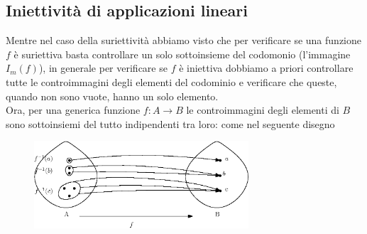 \subsection{Iniettività di applicazioni lineari}
Mentre nel caso della suriettività abbiamo visto che per verificare se una funzione $f$ è suriettiva basta
controllare un solo sottoinsieme del codomonio (l'immagine $I_m(f)$), in generale per verificare se $f$ è
iniettiva dobbiamo a priori controllare tutte le controimmagini degli elementi del codominio e verificare che
queste, quando non sono vuote, hanno un solo elemento.\\
Ora, per una generica funzione $f:A\to B$ le controimmagini degli elementi di $B$ sono sottoinsiemi del tutto
indipendenti tra loro: come nel seguente disegno
\begin{figure}[th]
  \centering
  \includegraphics[width=8cm]{img/finiti/imgex4-4-4.eps}
\end{figure}

